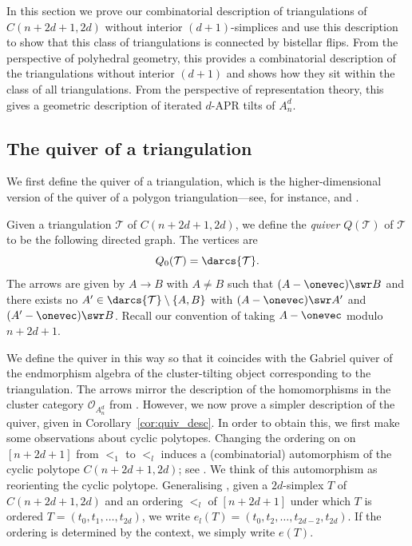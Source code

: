 In this section we prove our combinatorial description of triangulations of $C(n + 2d + 1, 2d)$ without interior $(d + 1)$-simplices and use this description to show that this class of triangulations is connected by bistellar flips. From the perspective of polyhedral geometry, this provides a combinatorial description of the triangulations without interior $(d + 1)$ and shows how they sit within the class of all triangulations. From the perspective of representation theory, this gives a geometric description of iterated $d$-APR tilts of $A_{n}^{d}$.

\subsection{The quiver of a triangulation}

We first define the quiver of a triangulation, which is the higher-dimensional version of the quiver of a polygon triangulation---see, for instance, \cite[Section 3]{cdm-03} and \cite[Definition 2.12]{lkw-clus-intro}.

\begin{defi}\label{def:quiver}
Given a triangulation $\mathcal{T}$ of $C(n + 2d + 1, 2d)$, we define the \emph{quiver} $Q(\mathcal{T})$ of $\mathcal{T}$ to be the following directed graph. The vertices are \[Q_{0}(\mathcal{T}) = \darcs{\mathcal{T}}.\] The arrows are given by $A \to B$ with $A \neq B$ such that $(A - \onevec) \swr B$ and there exists no $A' \in \darcs{\mathcal{T}}\setminus\{A, B\}$ with $(A - \onevec) \swr A'$ and $(A' - \onevec) \swr B$. Recall our convention of taking $A - \onevec$ modulo $n + 2d + 1$.
\end{defi}

We define the quiver in this way so that it coincides with the Gabriel quiver of the endmorphism algebra of the cluster-tilting object corresponding to the triangulation. The arrows mirror the description of the homomorphisms in the cluster category $\mathcal{O}_{A_{n}^{d}}$ from \cite{ot}. However, we now prove a simpler description of the quiver, given in Corollary~\ref{cor:quiv_desc}. In order to obtain this, we first make some observations about cyclic polytopes. Changing the ordering on on $[n + 2d + 1]$ from $<_{1}$ to $<_{l}$ induces a (combinatorial) automorphism of the cyclic polytope $C(n + 2d + 1, 2d)$; see \cite{kw}. We think of this automorphism as reorienting the cyclic polytope. Generalising \cite{ot}, given a $2d$-simplex $T$ of $C(n + 2d + 1,2d)$ and an ordering $<_{l}$ of $[n + 2d + 1]$ under which $T$ is ordered $T = (t_{0}, t_{1}, \dots , t_{2d})$, we write $e_{l}(T) = (t_{0}, t_{2}, \dots , t_{2d-2}, t_{2d})$. If the ordering is determined by the context, we simply write $e(T)$.

